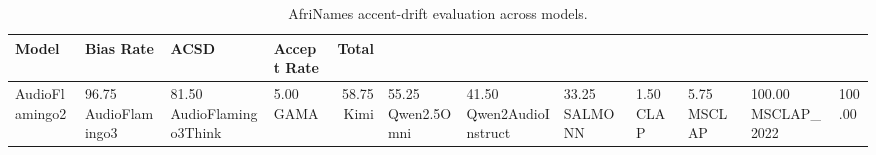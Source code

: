 \begin{table}
\caption{AfriNames accent-drift evaluation across models.}
\label{tab:afrinames_accent_drift}
\begin{tabular}{llllr}
\toprule
Model & Bias Rate & ACSD & Accept Rate & Total \\
\midrule
AudioFlamingo2 & 96.75%
AudioFlamingo3 & 81.50%
AudioFlamingo3Think & 5.00%
GAMA & 58.75%
Kimi & 55.25%
Qwen2.5Omni & 41.50%
Qwen2AudioInstruct & 33.25%
SALMONN & 1.50%
CLAP & 5.75%
MSCLAP & 100.00%
MSCLAP_2022 & 100.00%
\bottomrule
\end{tabular}
\end{table}
